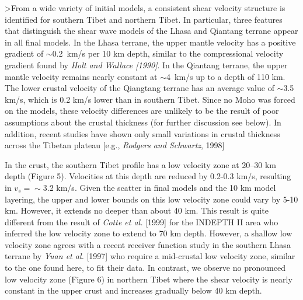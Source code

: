\documentclass[12pt]{article}
\begin{document}
>From a wide variety of initial models, a consistent shear velocity structure is identified for southern 
Tibet and northern Tibet. In particular, three features that distinguish the shear wave models of the Lhasa and Qiantang terrane appear in all final models.  
In the Lhasa terrane, the upper mantle velocity has a positive gradient of $\sim$0.2~km/s per 10 km depth, 
similar to the compressional velocity gradient found by {\it Holt and Wallace [1990]}.  In the Qiantang terrane, 
the upper mantle velocity remains nearly constant at $\sim$4~km/s up to a depth of 110 km. The lower crustal 
velocity of the Qiangtang terrane has an average value of $\sim$3.5 km/s, which is 0.2 km/s lower than in 
southern Tibet.  Since no Moho was forced on the models, these velocity differences are       unlikely to be the 
result of poor assumptions about the crustal thickness (for further
discussion see below).  In addition, recent studies have shown only small variations 
in crustal thickness across the Tibetan plateau [e.g., {\it Rodgers and Schwartz}, 1998]

In the crust, the southern Tibet profile has a low velocity zone at 20--30 km depth (Figure 5). 
Velocities at this depth are reduced by 0.2-0.3 km/s, resulting in $v_s=\sim$3.2 km/s.  Given the scatter in final 
models and the 10 km model layering, the upper and lower bounds on this low velocity zone could vary by 
5-10 km. However, it extends no deeper than about 40 km. This result
is quite different from the result of {\it Cotte et al.} [1999] for
the INDEPTH II area who inferred the low velocity zone to extend to 70
km depth.  However, a shallow low velocity zone agrees with a recent
receiver function study in the southern Lhasa terrane by {\it Yuan et 
al.} [1997] who require a mid-crustal low velocity zone, similar to the one found here, to fit their data.  In contrast, we observe no pronounced low velocity zone (Figure 6) in northern Tibet where the shear 
velocity is nearly constant in the upper crust and increases gradually below 40 km depth.  
\end{document}
